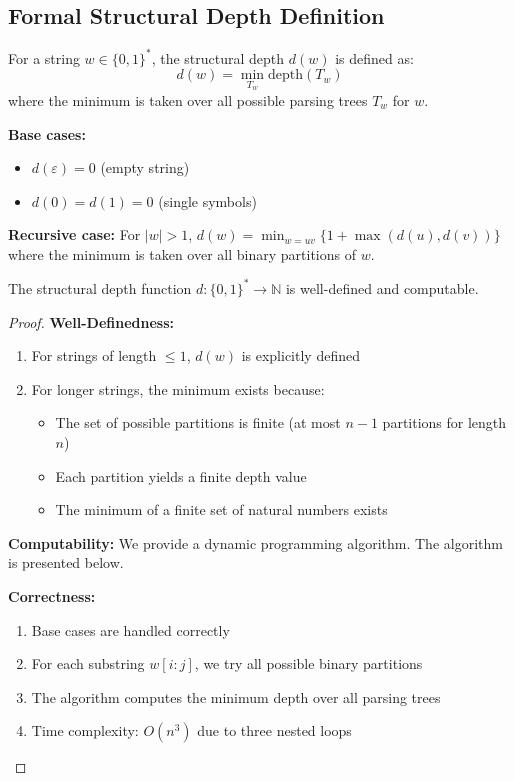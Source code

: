   \subsection{Formal Structural Depth Definition}
  
  \begin{definition}
  For a string $w \in \{0,1\}^*$, the structural depth $d(w)$ is defined as:
  $$d(w) = \min_{T_w} \text{depth}(T_w)$$
  where the minimum is taken over all possible parsing trees $T_w$ for $w$.
  
  \textbf{Base cases:}
  \begin{itemize}
  \item $d(\varepsilon) = 0$ (empty string)
  \item $d(0) = d(1) = 0$ (single symbols)
  \end{itemize}
  
  \textbf{Recursive case:}
  For $|w| > 1$, $d(w) = \min_{w=uv} \{1 + \max(d(u), d(v))\}$ where the minimum is taken over all binary partitions of $w$.
  \end{definition}
  
  \begin{lemma}
  The structural depth function $d: \{0,1\}^* \to \mathbb{N}$ is well-defined and computable.
  \end{lemma}
  
  \begin{proof}
  \textbf{Well-Definedness:}
  \begin{enumerate}
  \item For strings of length $\leq 1$, $d(w)$ is explicitly defined
  \item For longer strings, the minimum exists because:
    \begin{itemize}
    \item The set of possible partitions is finite (at most $n-1$ partitions for length $n$)
    \item Each partition yields a finite depth value
    \item The minimum of a finite set of natural numbers exists
    \end{itemize}
  \end{enumerate}
  
  \textbf{Computability:}
  We provide a dynamic programming algorithm. The algorithm is presented below.
  
  \textbf{Correctness:}
  \begin{enumerate}
  \item Base cases are handled correctly
  \item For each substring $w[i:j]$, we try all possible binary partitions
  \item The algorithm computes the minimum depth over all parsing trees
  \item Time complexity: $O(n^3)$ due to three nested loops
  \end{enumerate}
  \end{proof}
  
